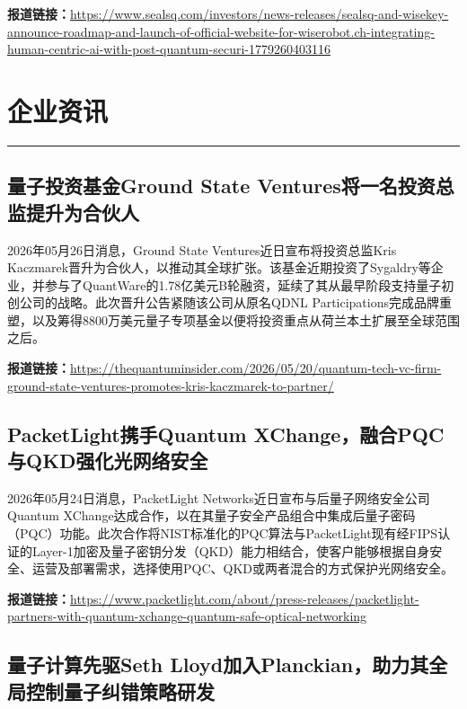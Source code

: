 \documentclass[12pt,a4paper]{ctexart}
\begin{document}
\noindent\textbf{报道链接：}\url{https://www.sealsq.com/investors/news-releases/sealsq-and-wisekey-announce-roadmap-and-launch-of-official-website-for-wiserobot.ch-integrating-human-centric-ai-with-post-quantum-securi-1779260403116}




\newpage
\section{企业资讯}
\vspace{-0.5em}
\noindent\rule{\linewidth}{1.5pt}

\subsection{ 量子投资基金Ground State Ventures将一名投资总监提升为合伙人 }

2026年05月26日消息，Ground State Ventures近日宣布将投资总监Kris Kaczmarek晋升为合伙人，以推动其全球扩张。该基金近期投资了Sygaldry等企业，并参与了QuantWare的1.78亿美元B轮融资，延续了其从最早阶段支持量子初创公司的战略。此次晋升公告紧随该公司从原名QDNL Participations完成品牌重塑，以及筹得8800万美元量子专项基金以便将投资重点从荷兰本土扩展至全球范围之后。

\noindent\textbf{报道链接：}\url{https://thequantuminsider.com/2026/05/20/quantum-tech-vc-firm-ground-state-ventures-promotes-kris-kaczmarek-to-partner/}

\subsection{ PacketLight携手Quantum XChange，融合PQC与QKD强化光网络安全 }

2026年05月24日消息，PacketLight Networks近日宣布与后量子网络安全公司Quantum XChange达成合作，以在其量子安全产品组合中集成后量子密码（PQC）功能。此次合作将NIST标准化的PQC算法与PacketLight现有经FIPS认证的Layer-1加密及量子密钥分发（QKD）能力相结合，使客户能够根据自身安全、运营及部署需求，选择使用PQC、QKD或两者混合的方式保护光网络安全。

\noindent\textbf{报道链接：}\url{https://www.packetlight.com/about/press-releases/packetlight-partners-with-quantum-xchange-quantum-safe-optical-networking}

\subsection{ 量子计算先驱Seth Lloyd加入Planckian，助力其全局控制量子纠错策略研发 }
\end{document}
